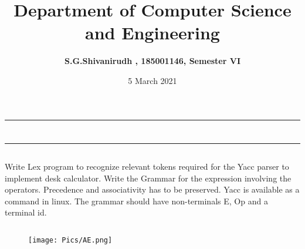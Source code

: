 \documentclass[12pt,letterpaper]{article}
\title{\textbf{Department of Computer Science and Engineering}}
\author{\textbf{S.G.Shivanirudh , 185001146, Semester VI }}
\date{5 March 2021}
\begin{document}
\maketitle
\hrule
\section*{}
\hrule 
\bigskip\bigskip

\subsection*{}

\subsection*{}
\begin{flushleft}
    Write Lex program to recognize relevant tokens required for the Yacc parser to implement desk calculator. 
    Write the Grammar for the expression involving the operators.
    Precedence and associativity has to be preserved. Yacc is available as a command in linux. 
    The grammar should have non-terminals E, Op and a terminal id.
\end{flushleft}

\subsection*{}
\subsubsection*{}
\begin{flushleft}

\end{flushleft}
\subsubsection*{}
\begin{flushleft}

\end{flushleft}

\newpage
\subsection*{}
\subsubsection*{}
\begin{figure}[h]
    \centering
    \texttt{[image: Pics/AE.png]}
\end{figure}
\end{document}
